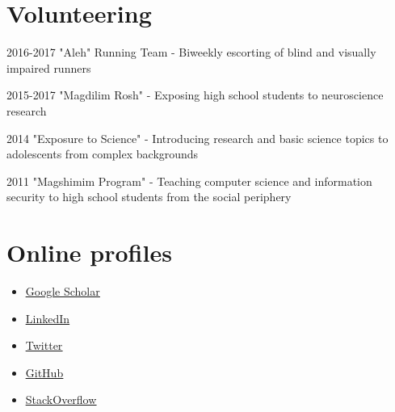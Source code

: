 \documentclass{tccv_Eyal}
\begin{document}
\section{Volunteering}
\begin{factlist}
\item{2016-2017}
    {"Aleh" Running Team - Biweekly escorting of blind and visually impaired runners}
\item{2015-2017}
    {"Magdilim Rosh" - Exposing high school students to neuroscience research}
\item{2014}
     {"Exposure to Science" - Introducing research and basic science topics to adolescents from complex backgrounds}
\item{2011}
{"Magshimim Program" - Teaching computer science and information security to high school students from the social periphery  }
\end{factlist}

\section{Online profiles}
\hypersetup{
    colorlinks=true,
    linkcolor=blue,
    filecolor=magenta,
    urlcolor=blue,
}
\begin{itemize}
    \item
    \href{https://scholar.google.co.il/citations?user=D36-7p8AAAAJ&hl=en}{\underline{Google Scholar}}
    \item
    \href{https://www.linkedin.com/in/eyal-itskovits-9b41a51/?originalSubdomain=il}{\underline{LinkedIn}}
    \item
    \href{https://twitter.com/itskov?lang=en}{\underline{Twitter}}
    \item
    \href{https://github.com/itskov}{\underline{GitHub}}
    \item
    \href{https://stackoverflow.com/users/931115/eyalitskovits}{\underline{StackOverflow}}
\end{itemize}


\vspace{-6pt} %

\newpage
\onecolumn
\end{document}
